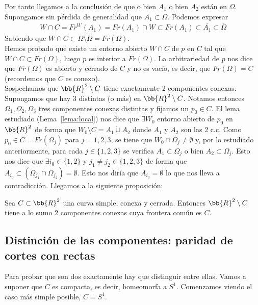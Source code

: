 \begin{observacion}
    Por tanto llegamos a la conclusión de que o bien $A_1$ o bien $A_2$ están en $\Omega$. Supongamos sin pérdida de generalidad que $A_1 \subset \Omega$. Podemos expresar
    \begin{gather*}
        W \cap C = Fr^W(A_1) = Fr(A_1) \cap W \subset Fr(A_1) \subset \overline{A_1} \subset \overline{\Omega}
    \end{gather*}
    Sabiendo que $W\cap C \subset \overline{\Omega} \setminus \Omega = Fr(\Omega)$. \\
    
    Hemos probado que existe un entorno abierto $W\cap C$ de $p$ en $C$ tal que $W\cap C \subset Fr(\Omega)$, luego $p$ es interior a $Fr(\Omega)$. La arbitrariedad de $p$ nos dice que $Fr(\Omega)$ es abierto y cerrado de $C$ y no es vacío, es decir, que $Fr(\Omega)=C$ (recordemos que $C$ es conexo).\\

    Sospechamos que $\bb{R}^2 \setminus C$ tiene exactamente 2 componentes conexas. Supongamos que hay 3 distintas (o más) en $\bb{R}^2 \setminus C$. Notamos entonces $\Omega_1, \Omega_2, \Omega_3$ tres componentes conexas distintas y fijamos un $p_0\in C$. El lema estudiado (Lema~\ref{lema:local}) nos dice que $\exists W_0$ entorno abierto de $p_0$ en $\bb{R}^2$ de forma que $W_0\setminus C = A_1 \dot{\cup} A_2$ donde $A_1$ y $A_2$ son las 2 c.c. Como $p_0\in C=Fr(\Omega_j)$ para $j=1,2,3$, se tiene que $W_0\cap \Omega_j\neq\emptyset$ y, por lo estudiado anteriormente, para cada $j\in\{1,2,3\}$ se verifica $A_1 \subset \Omega_j$ o bien $A_2\subset \Omega_j$. Esto nos dice que $\exists i_0 \in \{1,2\}$ y $j_1\neq j_2 \in \{1,2,3\}$ de forma que $A_{i_0} \subset (\Omega_{j_1}\cap \Omega_{j_2})=\emptyset$. Esto nos diría que $A_{i_0}=\emptyset$ lo que nos lleva a contradicción. Llegamos a la siguiente proposición:
\end{observacion}

\begin{prop}\label{prop:max2}
    Sea $C\subset \bb{R}^2$ una curva simple, conexa y cerrada. Entonces $\bb{R}^2 \setminus C$ tiene a lo sumo 2 componentes conexas cuya frontera común es $C$.
\end{prop}

\subsection{Distinción de las componentes: paridad de cortes con rectas}

Para probar que son dos exactamente hay que distinguir entre ellas. Vamos a suponer que $C$ es compacta, es decir, homeomorfa a $S^1$. Comenzamos viendo el caso más simple posible, $C=S^1$.\\

